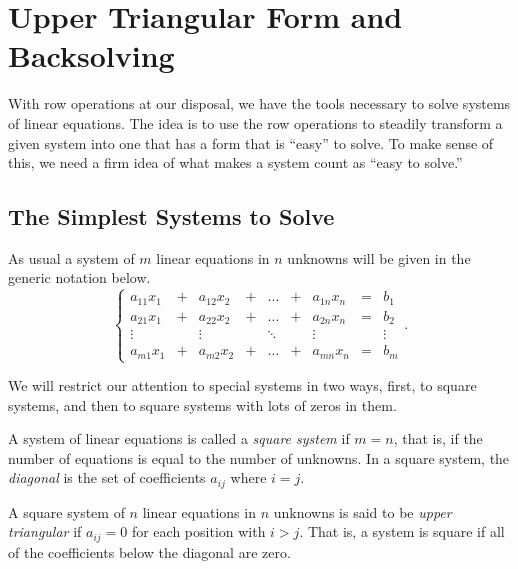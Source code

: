 \documentclass[elementsmain.tex]{subfiles}
\begin{document}
\section{Upper Triangular Form and Backsolving}

With row operations at our disposal, we have the tools necessary to solve systems of linear equations. The idea is to use the row operations to steadily transform a given system into one that has a form that is ``easy'' to solve. To make sense of this, we need a firm idea of what makes a system count as ``easy to solve.''



\subsection*{The Simplest Systems to Solve}

As usual a system of $m$ linear equations in $n$ unknowns will be given in the generic notation below.
\begin{equation}\label{eq:09-sys}
\left\{
\begin{array}{ccccccccc}
a_{11} x_1 & + & a_{12} x_2 & + & \dots & + & a_{1n} x_n & = & b_1 \\
a_{21} x_1 & + & a_{22} x_2 & + & \dots & + & a_{2n} x_n & = & b_2 \\
\vdots     &   & \vdots     &   & \ddots &  & \vdots     &  & \vdots \\ 
a_{m1} x_1 & + & a_{m2} x_2 & + & \dots & + & a_{mn} x_n & = & b_m 
\end{array}\right..
\end{equation}

We will restrict our attention to special systems in two ways, first, to square systems, and then to square systems with lots of zeros in them.

\begin{definition}  A system of linear equations is called a \emph{square system} if $m=n$, that is, if the number of equations is equal to the number of unknowns.
In a square system, the \emph{diagonal} is the set of coefficients $a_{ij}$ where $i=j$.
\end{definition}

\begin{definition}
A square system of $n$ linear equations in $n$ unknowns is said to be \emph{upper triangular} if $a_{ij} = 0$ for each position with $i>j$. That is, a system is square if all of the coefficients below the diagonal are zero.
\end{definition}
\end{document}
